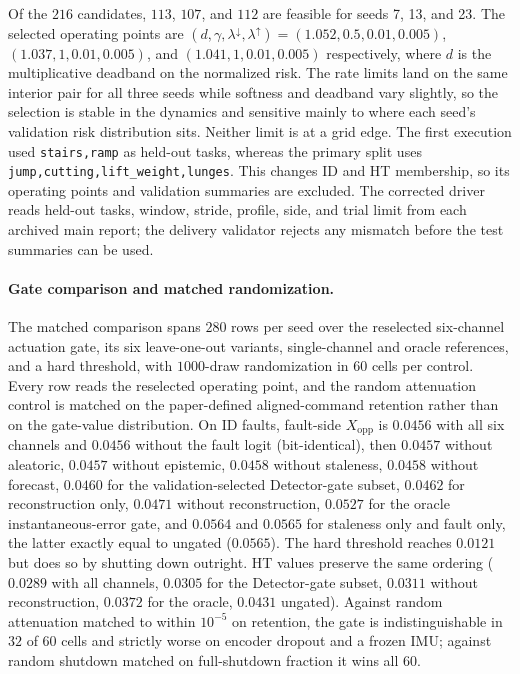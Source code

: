 \documentclass[letterpaper]{article}
\begin{document}
Of the $216$ candidates, $113$, $107$, and $112$ are feasible for seeds 7, 13,
and 23. The selected operating points are
$(d,\gamma,\lambda^{\downarrow},\lambda^{\uparrow})
=(1.052,0.5,0.01,0.005)$, $(1.037,1,0.01,0.005)$, and
$(1.041,1,0.01,0.005)$ respectively, where $d$ is the multiplicative deadband on
the normalized risk. The rate limits land on the same interior pair for all three
seeds while softness and deadband vary slightly, so the selection is stable in
the dynamics and sensitive mainly to where each seed's validation risk
distribution sits. Neither limit is at a grid edge.
The first execution used
\texttt{stairs,ramp} as held-out tasks, whereas the primary split uses
\texttt{jump,cutting,lift\_weight,lunges}. This changes ID and HT membership,
so its operating points and validation summaries are excluded. The corrected
driver reads held-out tasks, window, stride, profile, side, and trial limit from
each archived main report; the delivery validator rejects any mismatch before
the test summaries can be used.

\paragraph{Gate comparison and matched randomization.}
The matched comparison spans $280$ rows per seed over the reselected
six-channel actuation gate, its six leave-one-out variants, single-channel and
oracle references, and a hard threshold, with $1000$-draw randomization in
$60$ cells per control. Every row reads the reselected operating point, and the
random attenuation control is matched on the paper-defined aligned-command
retention rather than on the gate-value distribution. On ID faults, fault-side
$X_{\mathrm{opp}}$ is $0.0456$ with all six channels and $0.0456$ without the
fault logit (bit-identical), then $0.0457$ without aleatoric, $0.0457$ without
epistemic, $0.0458$ without staleness, $0.0458$ without forecast, $0.0460$ for
the validation-selected Detector-gate subset, $0.0462$ for reconstruction only,
$0.0471$ without reconstruction, $0.0527$ for the oracle instantaneous-error
gate, and $0.0564$ and $0.0565$ for staleness only and fault only, the latter
exactly equal to ungated ($0.0565$). The hard threshold reaches $0.0121$ but
does so by shutting down outright. HT values preserve the same ordering
($0.0289$ with all channels, $0.0305$ for the Detector-gate subset, $0.0311$
without reconstruction, $0.0372$ for the oracle, $0.0431$ ungated). Against
random attenuation matched to within $10^{-5}$ on retention, the gate is
indistinguishable in $32$ of $60$ cells and strictly worse on encoder dropout
and a frozen IMU; against random shutdown matched on full-shutdown fraction it
wins all $60$.
\end{document}

